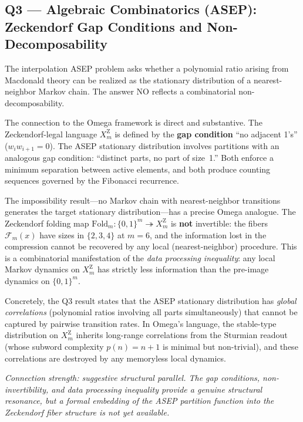 \subsection{Q3 --- Algebraic Combinatorics (ASEP):
  Zeckendorf Gap Conditions and Non-Decomposability}
\label{ss:omega-q3}

\begin{remark}
The interpolation ASEP problem asks whether a polynomial ratio
arising from Macdonald theory can be realized as the stationary
distribution of a nearest-neighbor Markov chain.
The answer NO reflects a combinatorial non-decomposability.

The connection to the Omega framework is direct and substantive.
The Zeckendorf-legal language $X_m^{\mathrm Z}$ is defined by the
\textbf{gap condition} ``no adjacent 1's'' ($w_iw_{i+1}=0$).
The ASEP stationary distribution involves partitions with an
analogous gap condition: ``distinct parts, no part of size~1.''
Both enforce a minimum separation between active elements, and both
produce counting sequences governed by the Fibonacci recurrence.

The impossibility result---no Markov chain with nearest-neighbor
transitions generates the target stationary distribution---has a
precise Omega analogue.  The Zeckendorf folding map
$\mathrm{Fold}_m\colon\{0,1\}^m\twoheadrightarrow X_m^{\mathrm Z}$
is \textbf{not} invertible: the fibers $\mathcal F_m(x)$ have
sizes in $\{2,3,4\}$ at $m=6$, and the information lost in the
compression cannot be recovered by any local (nearest-neighbor)
procedure.  This is a combinatorial manifestation of the
\emph{data processing inequality}: any local Markov dynamics on
$X_m^{\mathrm Z}$ has strictly less information than the pre-image
dynamics on $\{0,1\}^m$.

Concretely, the Q3 result states that the ASEP stationary
distribution has \emph{global correlations} (polynomial ratios
involving all parts simultaneously) that cannot be captured by
pairwise transition rates.  In Omega's language, the stable-type
distribution on $X_m^{\mathrm Z}$ inherits long-range correlations
from the Sturmian readout (whose subword complexity $p(n)=n+1$
is minimal but non-trivial), and these correlations are destroyed
by any memoryless local dynamics.

\emph{Connection strength: suggestive structural parallel.
The gap conditions, non-invertibility, and data processing
inequality provide a genuine structural resonance, but a formal
embedding of the ASEP partition function into the Zeckendorf
fiber structure is not yet available.}
\end{remark}


